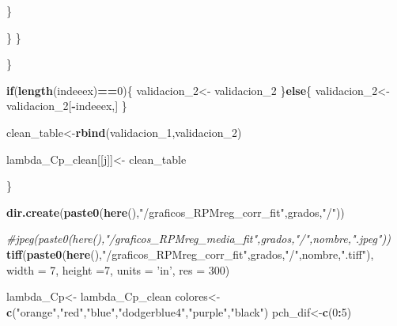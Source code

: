 \documentclass[]{article}
\newenvironment{Shaded}{\begin{snugshade}}{\end{snugshade}}
\newcommand{\KeywordTok}[1]{\textcolor[rgb]{0.13,0.29,0.53}{\textbf{#1}}}
\newcommand{\DataTypeTok}[1]{\textcolor[rgb]{0.13,0.29,0.53}{#1}}
\newcommand{\DecValTok}[1]{\textcolor[rgb]{0.00,0.00,0.81}{#1}}
\newcommand{\StringTok}[1]{\textcolor[rgb]{0.31,0.60,0.02}{#1}}
\newcommand{\CommentTok}[1]{\textcolor[rgb]{0.56,0.35,0.01}{\textit{#1}}}
\newcommand{\ControlFlowTok}[1]{\textcolor[rgb]{0.13,0.29,0.53}{\textbf{#1}}}
\newcommand{\OperatorTok}[1]{\textcolor[rgb]{0.81,0.36,0.00}{\textbf{#1}}}
\newcommand{\NormalTok}[1]{#1}
\begin{document}
\begin{Shaded}
\begin{Highlighting}[]
{{              
\NormalTok{            \}}
            
\NormalTok{          \}}
\NormalTok{        \}}
        
\NormalTok{      \}}
      
      \ControlFlowTok{if}\NormalTok{(}\KeywordTok{length}\NormalTok{(indeeex)}\OperatorTok{==}\DecValTok{0}\NormalTok{)\{}
\NormalTok{        validacion_}\DecValTok{2}\NormalTok{<-}\StringTok{ }\NormalTok{validacion_}\DecValTok{2}
\NormalTok{      \}}\ControlFlowTok{else}\NormalTok{\{}
\NormalTok{        validacion_}\DecValTok{2}\NormalTok{<-validacion_}\DecValTok{2}\NormalTok{[}\OperatorTok{-}\NormalTok{indeeex,]}
\NormalTok{      \}}
      
\NormalTok{      clean_table<-}\KeywordTok{rbind}\NormalTok{(validacion_}\DecValTok{1}\NormalTok{,validacion_}\DecValTok{2}\NormalTok{)}
      
      
\NormalTok{      lambda_Cp_clean[[j]]<-}\StringTok{ }\NormalTok{clean_table}
      
\NormalTok{    \}}
    
    
    
    
    
    
    \KeywordTok{dir.create}\NormalTok{(}\KeywordTok{paste0}\NormalTok{(}\KeywordTok{here}\NormalTok{(),}\StringTok{"/graficos_RPMreg_corr_fit"}\NormalTok{,grados,}\StringTok{"/"}\NormalTok{))}
    
    \CommentTok{#jpeg(paste0(here(),"/graficos_RPMreg_media_fit",grados,"/",nombre,".jpeg"))}
    \KeywordTok{tiff}\NormalTok{(}\KeywordTok{paste0}\NormalTok{(}\KeywordTok{here}\NormalTok{(),}\StringTok{"/graficos_RPMreg_corr_fit"}\NormalTok{,grados,}\StringTok{"/"}\NormalTok{,nombre,}\StringTok{".tiff"}\NormalTok{), }\DataTypeTok{width =} \DecValTok{7}\NormalTok{, }\DataTypeTok{height =}\DecValTok{7}\NormalTok{, }\DataTypeTok{units =} \StringTok{'in'}\NormalTok{, }\DataTypeTok{res =} \DecValTok{300}\NormalTok{)}
    
    
    
    
\NormalTok{    lambda_Cp<-}\StringTok{ }\NormalTok{lambda_Cp_clean}
\NormalTok{    colores<-}\StringTok{ }\KeywordTok{c}\NormalTok{(}\StringTok{"orange"}\NormalTok{,}\StringTok{"red"}\NormalTok{,}\StringTok{"blue"}\NormalTok{,}\StringTok{"dodgerblue4"}\NormalTok{,}\StringTok{"purple"}\NormalTok{,}\StringTok{"black"}\NormalTok{)}
\NormalTok{    pch_dif<-}\KeywordTok{c}\NormalTok{(}\DecValTok{0}\OperatorTok{:}\DecValTok{5}\NormalTok{)}
    
}}
\end{Highlighting}
\end{Shaded}
\end{document}

